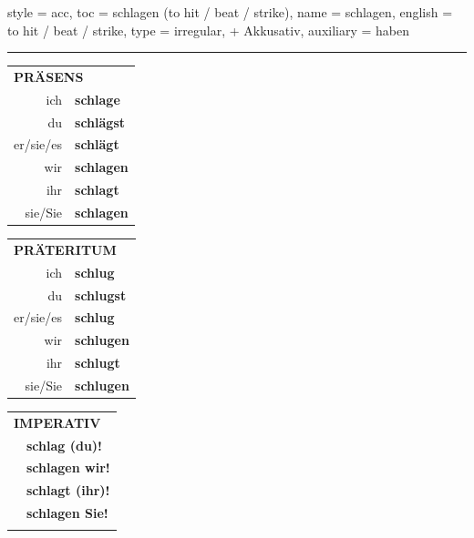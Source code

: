 \begin{verbentry}{
  style = {acc},
  toc = {schlagen (to hit / beat / strike)},
  name = {schlagen},
  english = {to hit / beat / strike},
  type = {irregular, + Akkusativ},
  auxiliary = {haben}
}
 
    
     \vspace{5pt}

    \hrule
    
    \vspace{5pt}

  \begin{tabular}{rl}
     \multicolumn{2}{l}{\textbf{PRÄSENS} }\\
    ich & \textbf{schlage}\\
    du & \textbf{schlägst}\\
    er/sie/es & \textbf{schlägt}\\
    wir & \textbf{schlagen}\\
    ihr & \textbf{schlagt}\\
    sie/Sie & \textbf{schlagen}\\
  \end{tabular}
  \hfill
  \begin{tabular}{rl}
    \multicolumn{2}{l}{\textbf{PRÄTERITUM} }\\
    ich & \textbf{schlug}\\
    du & \textbf{schlugst}\\
    er/sie/es & \textbf{schlug}\\
    wir & \textbf{schlugen}\\
    ihr & \textbf{schlugt}\\
    sie/Sie & \textbf{schlugen}\\
  \end{tabular}
  \hfill
  \begin{tabular}{rl}
     \multicolumn{2}{l}{\textbf{IMPERATIV} }\\
   & \textbf{schlag (du)!}\\
   & \textbf{schlagen wir!}\\
   & \textbf{schlagt (ihr)!}\\
   & \textbf{schlagen Sie!}\\
   & \vspace{10pt}
  \end{tabular}

 \vspace{10pt}


\end{verbentry}
